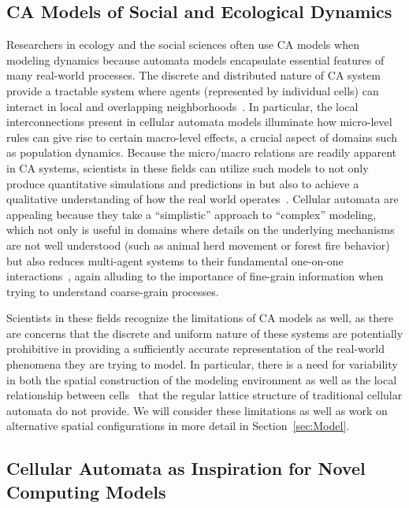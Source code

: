 \documentclass[a4paper,11pt]{report}
\begin{document}
\subsection{CA Models of Social and Ecological Dynamics}

Researchers in ecology and the social sciences often use CA models when modeling dynamics because automata models encapsulate essential features of many real-world processes. The discrete and distributed nature of CA system provide a tractable system where agents (represented by individual cells) can interact in local and overlapping neighborhoods~\cite{he98,bi07}. In particular, the local interconnections present in cellular automata models illuminate how micro-level rules can give rise to certain macro-level effects, a crucial aspect of domains such as population dynamics. Because the micro/macro relations are readily apparent in CA systems, scientists in these fields can utilize such models to not only produce quantitative simulations and predictions in but also to achieve a qualitative understanding of how the real world operates~\cite{he98}. Cellular automata are appealing because they take a ``simplistic'' approach to 
``complex'' modeling, which not only is useful in domains where details on the underlying mechanisms are not well understood (such as animal herd movement or forest fire behavior) but also reduces multi-agent systems to their fundamental one-on-one interactions~\cite{bi07,ca06}, again alluding to the importance of fine-grain information when trying to understand coarse-grain processes. 

Scientists in these fields recognize the limitations of CA models as well, as there are concerns that the discrete and uniform nature of these systems are potentially prohibitive in providing a sufficiently accurate representation of the real-world phenomena they are trying to model. In particular, there is a need for variability in both the spatial construction of the modeling environment as well as the local relationship between cells~\cite{fl01} that the regular lattice structure of traditional cellular automata do not provide. We will consider these limitations as well as work on alternative spatial configurations in more detail in Section~\ref{sec:Model}.

\subsection{Cellular Automata as Inspiration for Novel Computing Models}
\end{document}
